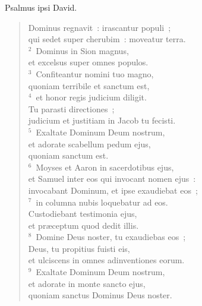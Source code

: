 \lettrine[lines=3,image=true,loversize=0.05,lraise=-0.03]{P}{}salmus ipsi David. \begin{flushleft}\begin{verse}\vspace{6pt}Dominus regnavit~: irascantur populi~;\\ qui sedet super cherubim~: moveatur terra.\\
${}^{2}$~Dominus in Sion magnus,\\ et excelsus super omnes populos.\\
${}^{3}$~Confiteantur nomini tuo magno,\\ quoniam terribile et sanctum est,\\
${}^{4}$~et honor regis judicium diligit.\\ Tu parasti directiones~;\\ judicium et justitiam in Jacob tu fecisti.\\
${}^{5}$~Exaltate Dominum Deum nostrum,\\ et adorate scabellum pedum ejus,\\ quoniam sanctum est.\\
${}^{6}$~Moyses et Aaron in sacerdotibus ejus,\\ et Samuel inter eos qui invocant nomen ejus~:\\ invocabant Dominum, et ipse exaudiebat eos~;\\
${}^{7}$~in columna nubis loquebatur ad eos.\\ Custodiebant testimonia ejus,\\ et pr\ae ceptum quod dedit illis.\\
${}^{8}$~Domine Deus noster, tu exaudiebas eos~;\\ Deus, tu propitius fuisti eis,\\ et ulciscens in omnes adinventiones eorum.\\
${}^{9}$~Exaltate Dominum Deum nostrum,\\ et adorate in monte sancto ejus,\\ quoniam sanctus Dominus Deus noster.\end{verse}\end{flushleft}



